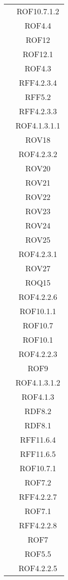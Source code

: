 \begin{longtable}{|c|c|}
& ROF10.7.1.2\\
& ROF4.4\\
& ROF12\\
& ROF12.1\\
& ROF4.3\\
& RFF4.2.3.4\\
& RFF5.2\\
& RFF4.2.3.3\\
& ROF4.1.3.1.1\\
& ROV18\\
& ROF4.2.3.2\\
& ROV20\\
& ROV21\\
& ROV22\\
& ROV23\\
& ROV24\\
& ROV25\\
& ROF4.2.3.1\\
& ROV27\\
& ROQ15\\
& ROF4.2.2.6\\
& ROF10.1.1\\
& ROF10.7\\
& ROF10.1\\
& ROF4.2.2.3\\
& ROF9\\
& ROF4.1.3.1.2\\
& ROF4.1.3\\
& RDF8.2\\
& RDF8.1\\
& RFF11.6.4\\
& RFF11.6.5\\
& ROF10.7.1\\
& ROF7.2\\
& RFF4.2.2.7\\
& ROF7.1\\
& RFF4.2.2.8\\
& ROF7\\
& ROF5.5\\
& ROF4.2.2.5\\


\end{longtable}
